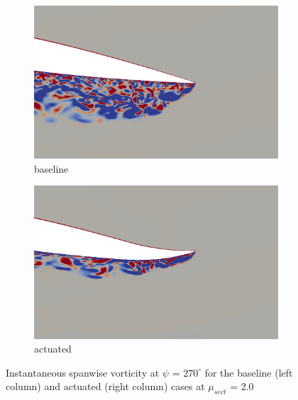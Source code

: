 \begin{figure}[H]
	\centering
	
	\begin{subfigure}[b]{0.4\textwidth}
		\centering
		\includegraphics[width=1\textwidth]{figures/mu_2pt0/baseline/ph_270_vorticity_zoomed_airfoil.png}
		\caption{ baseline}
		\label{fig:mu_2pt0_baseline_zoomed_vorticity}
	\end{subfigure}
	\begin{subfigure}[b]{0.4\textwidth}
		\centering
		\includegraphics[width=1\textwidth]{figures/mu_2pt0/AC/ph_270_vorticity_zoomed_airfoil.png}
		\caption{actuated}
		\label{fig:mu_2pt0_AC_zoomed_vorticity}
	\end{subfigure}
	\caption{Instantaneous spanwise vorticity at $\psi$ = $270^\circ$ for the baseline (left column) and actuated (right column) cases at $\mu_{sect}$ = 2.0}
	\label{fig:mu_2pt0_zoomed_vorticity}
\end{figure}

